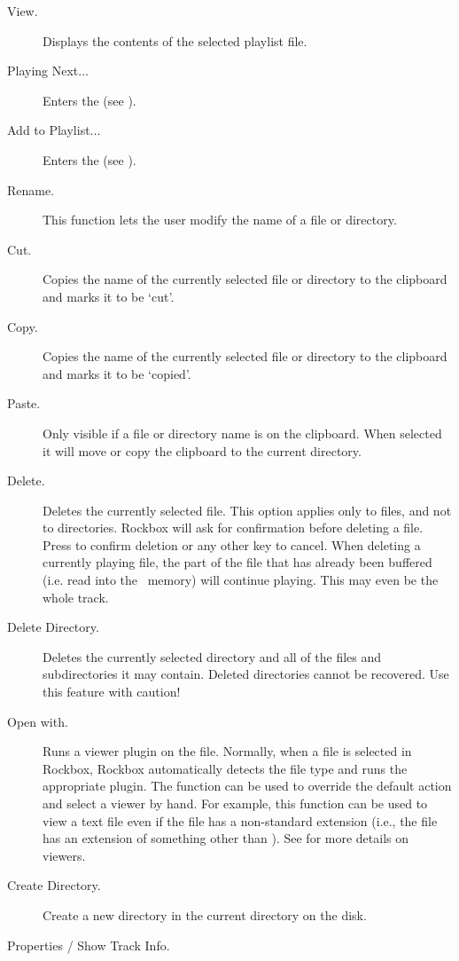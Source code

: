 \begin{description}
\item [View.]
  Displays the contents of the selected playlist file.
\item [Playing Next...]
  Enters the  (see ).
\item [Add to Playlist...]
  Enters the  (see
  ).
\item [Rename.]
  This function lets the user modify the name of a file or directory.
\item [Cut.]
  Copies the name of the currently selected file or directory to the clipboard
  and marks it to be `cut'.
\item [Copy.]
  Copies the name of the currently selected file or directory to the clipboard
  and marks it to be `copied'.
\item [Paste.]
  Only visible if a file or directory name is on the clipboard. When selected
  it will move or copy the clipboard to the current directory.
\item [Delete.]
  Deletes the currently selected file. This option applies only to files, and
  not to directories. Rockbox will ask for confirmation before deleting a file.
  Press \ActionYesNoAccept{}
  to confirm deletion or any other key to cancel. When deleting a currently
  playing file, the part of the file that has already been buffered (i.e. read
  into the \daps\ memory) will continue playing. This may even be the whole track.
\item [Delete Directory.]
  Deletes the currently selected directory and all of the files and subdirectories
  it may contain. Deleted directories cannot be recovered. Use this feature with
  caution!
\item [Open with.]
  Runs a viewer plugin on the file. Normally, when a file is selected in Rockbox,
  Rockbox automatically detects the file type and runs the appropriate plugin.
  The  function can be used to override the default action and
  select a viewer by hand.
  For example, this function can be used to view a text file
  even if the file has a non-standard extension (i.e., the file has an extension
  of something other than ). See 
  for more details on viewers.
\item [Create Directory.]
  Create a new directory in the current directory on the disk.
\item [Properties / Show Track Info.]

\end{description}
